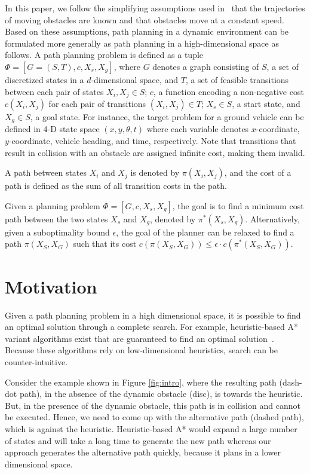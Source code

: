 In this paper, we follow the simplifying assumptions used in~\cite{phillips2011sipp} that the trajectories of moving obstacles are known and that obstacles move at a constant speed. Based on these assumptions, path planning in a dynamic environment can be formulated more generally as path planning in a high-dimensional space as follows. A path planning problem is defined as a tuple $\Phi = [G = (S, T), c, X_{s}, X_{g}]$, where $G$ denotes a graph consisting of $S$, a set of discretized states in a $d$-dimensional space, and $T$, a set of feasible transitions between each pair of states $X_i, X_j \in S$; $c$, a function encoding a non-negative cost $c(X_i,X_j)$ for each pair of transitions $(X_i,X_j) \in T$; $X_{s} \in S$, a start state, and $X_{g} \in S$, a goal state. For instance, the target problem for a ground vehicle can be defined in 4-D state space $(x, y, \theta, t)$ where each variable denotes $x$-coordinate, $y$-coordinate, vehicle heading, and time, respectively. Note that transitions that result in collision with an obstacle are assigned infinite cost, making them invalid. 

A path between states $X_i$ and $X_j$ is denoted by $\pi(X_i,X_j)$, and the cost of a path is defined as the sum of all transition costs in the path. 

Given a planning problem $\Phi = [G, c, X_{s}, X_{g}]$, the goal is to find a minimum cost path between the two states $X_{s}$ and $X_{g}$, denoted by $\pi^*(X_s,X_g)$. 
Alternatively, given a suboptimality bound $\epsilon$, the goal of the planner can be relaxed to find a path $\pi(X_S,X_G)$ such that its cost $c(\pi(X_S,X_G)) \leq \epsilon \cdot c(\pi^*(X_S,X_G))$.

\section{Motivation}\label{sec:motivation}

Given a path planning problem in a high dimensional space, it is possible to find an optimal solution through a complete search. For example, heuristic-based A* variant algorithms exist that are guaranteed to find an optimal solution~\cite{silver2005cooperative}. Because these algorithms rely on low-dimensional heuristics, search can be counter-intuitive.  

Consider the example shown in Figure \ref{fig:intro}, where the resulting path (dash-dot path), in the absence of the dynamic obstacle (disc), is towards the heuristic. But, in the presence of the dynamic obstacle, this path is in collision and cannot be executed. Hence, we need to come up with the alternative path (dashed path), which is against the heuristic. Heuristic-based A* would expand a large number of states and will take a long time to generate the new path whereas our approach generates the alternative path quickly, because it plans in a lower dimensional space.

